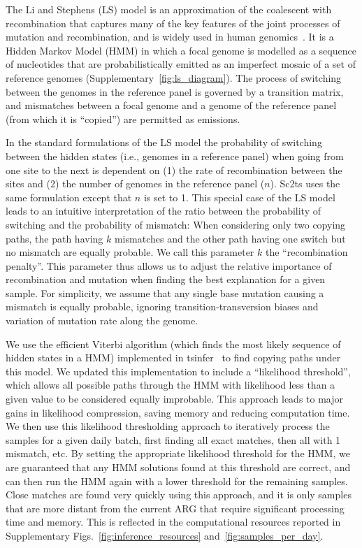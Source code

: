 \documentclass[12pt]{article}
\makeatletter
\newcommand{\siref}[1]{Supplementary~\ref{#1}}
\newcommand{\refprefix}[1]{#1~}
\newcommand{\numref}[1]{{\let\refprefix\@gobble\ref{#1}}}
\makeatother
\begin{document}
The Li and Stephens (LS) model \cite{LiStephens2003} is an approximation of
the coalescent with recombination
that captures many of the key features of
the joint processes of mutation and recombination,
and is widely used in human genomics~\cite{Delaneau2019-wl,Browning2018-nk}.
It is a Hidden Markov Model (HMM) in which a focal genome
is modelled as a
sequence of nucleotides that are probabilistically emitted as
an imperfect mosaic of a set of reference genomes
(\siref{fig:ls_diagram}).
The process of switching between the genomes in the reference panel
is governed by a transition matrix,
and mismatches between a focal genome and a genome of the reference panel
(from which it is ``copied'') are permitted as emissions.

In the standard formulations of the LS model
\cite{LiStephens2003,Donnelly2010-coalescent}
the probability of switching
between the hidden states (i.e., genomes in a reference panel)
when going from one site to the next is dependent on
(1) the rate of recombination between the sites and
(2) the number of genomes in the reference panel ($n$).
Sc2ts uses the same formulation except that $n$ is set to 1.
This special case of the LS model leads to an intuitive interpretation of
the ratio between the probability of switching and the probability of mismatch:
When considering only two copying paths, the path having $k$ mismatches
and the other path having one switch but no mismatch are equally probable.
We call this parameter $k$ the ``recombination penalty''.
This parameter thus allows us to adjust
the relative importance of recombination and mutation
when finding the best explanation for a given sample.
For simplicity, we assume that any single base mutation
causing a mismatch is equally probable,
ignoring transition-transversion biases and
variation of mutation rate along the genome.

We use the efficient Viterbi algorithm
(which finds the most likely sequence of hidden states in a HMM)
implemented in tsinfer~\cite{Kelleher2019}
to find copying paths under this model. We updated this
implementation to include a ``likelihood threshold'', which allows
all possible paths through the HMM with likelihood less than a given
value to be considered equally improbable. This approach leads to major
gains in likelihood compression, saving memory and reducing computation
time. We then use this likelihood thresholding approach to iteratively
process the samples for a given daily batch, first finding all exact
matches, then all with 1 mismatch, etc. By setting the appropriate
likelihood threshold for the HMM, we are guaranteed that any HMM
solutions found at this threshold are correct, and can then run the HMM again
with a lower threshold for the remaining samples. Close matches
are found very quickly using this approach, and it is only
samples that are more distant from the current ARG that require
significant processing time and memory. This is reflected in
the computational resources reported in
Supplementary Figs.~\numref{fig:inference_resources} and~\numref{fig:samples_per_day}.
\end{document}
